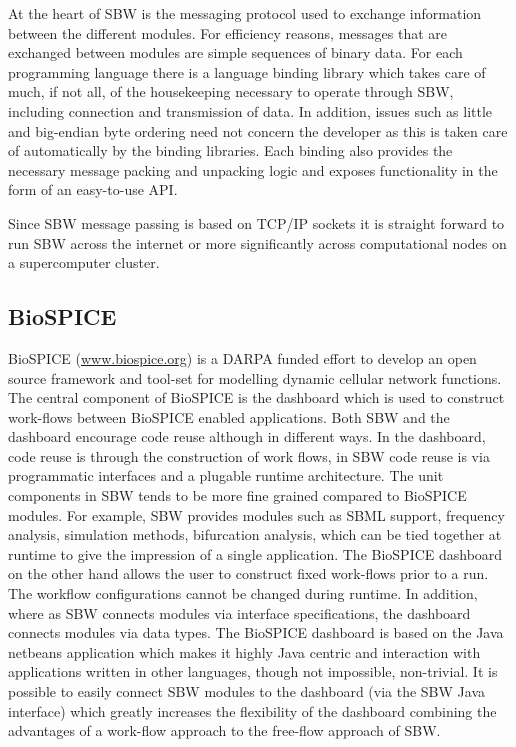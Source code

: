\documentclass[12pt]{article}
\begin{document}
{At the heart of SBW is the messaging protocol used to exchange
information between the different modules. For efficiency reasons,
messages that are exchanged between modules are simple sequences
of binary data. For each programming language there is a language
binding library which takes care of much, if not all, of the
housekeeping necessary to operate through SBW, including
connection and transmission of data. In addition, issues such as
little and big-endian byte ordering need not concern the developer
as this is taken care of automatically by the binding libraries.
Each binding also provides the necessary message packing and
unpacking logic and exposes functionality in the form of an
easy-to-use API.

Since SBW message passing is based on TCP/IP sockets it is straight forward
to run SBW across the internet or more significantly across computational nodes
on a supercomputer cluster.

\subsection{BioSPICE}

BioSPICE (\url{www.biospice.org}) is a DARPA funded effort to
develop an open source framework and tool-set for modelling
dynamic cellular network functions. The central component of
BioSPICE is the dashboard which is used to construct work-flows
between BioSPICE enabled applications. Both SBW and the dashboard
encourage code reuse although in different ways. In the dashboard,
code reuse is through the construction of work flows, in SBW code
reuse is via programmatic interfaces and a plugable runtime
architecture. The unit components in SBW tends to be more fine
grained compared to BioSPICE modules. For example, SBW provides
modules such as SBML support, frequency analysis, simulation
methods, bifurcation analysis, which can be tied together at runtime to give the
impression of a single application. The BioSPICE dashboard on the
other hand allows the user to construct fixed work-flows prior
to a run. The workflow configurations cannot be changed during runtime. In addition, where as SBW connects modules via interface specifications, the dashboard connects modules via data types. The BioSPICE dashboard is based on the Java netbeans application which makes it highly Java centric and interaction with applications written in other
languages, though not impossible, non-trivial. It is possible to easily connect
SBW modules to the dashboard (via the SBW Java interface) which greatly increases the
flexibility of the dashboard combining the advantages of a
work-flow approach to the free-flow approach of SBW.

}
\end{document}
